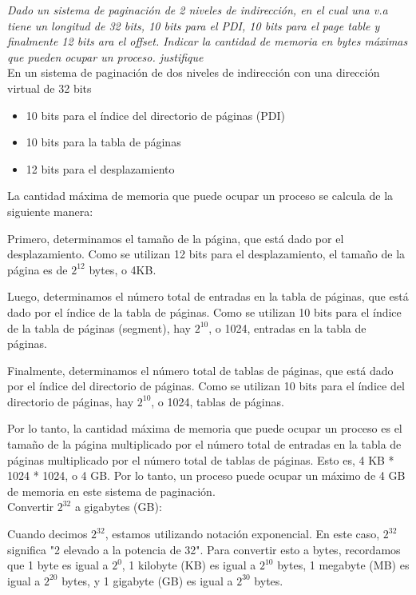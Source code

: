 \documentclass[../main.tex]{subfiles}
\begin{document}
    \begin{exercise}
        \textit{Dado un sistema de paginación de 2 niveles de indirección, en el cual una v.a tiene un longitud de 32 bits, 10 bits para el PDI, 10 bits para el page table y finalmente 12 bits ara el offset. Indicar la cantidad de memoria en bytes máximas que pueden ocupar un proceso. justifique}\\
        
        En un sistema de paginación de dos niveles de indirección con una dirección virtual de 32 bits

        \begin{itemize}
            \item 10 bits para el índice del directorio de páginas (PDI)
            \item 10 bits para la tabla de páginas
            \item 12 bits para el desplazamiento
        \end{itemize}

        La cantidad máxima de memoria que puede ocupar un proceso se calcula de la siguiente manera:

        Primero, determinamos el tamaño de la página, que está dado por el desplazamiento. Como se utilizan 12 bits para el desplazamiento, el tamaño de la página es de $2^12$ bytes, o 4KB.

        Luego, determinamos el número total de entradas en la tabla de páginas, que está dado por el índice de la tabla de páginas. Como se utilizan 10 bits para el índice de la tabla de páginas (segment), hay $2^10$, o 1024, entradas en la tabla de páginas.

        Finalmente, determinamos el número total de tablas de páginas, que está dado por el índice del directorio de páginas. Como se utilizan 10 bits para el índice del directorio de páginas, hay $2^10$, o 1024, tablas de páginas.

        Por lo tanto, la cantidad máxima de memoria que puede ocupar un proceso es el tamaño de la página multiplicado por el número total de entradas en la tabla de páginas multiplicado por el número total de tablas de páginas. Esto es, 4 KB * 1024 * 1024, o 4 GB. Por lo tanto, un proceso puede ocupar un máximo de 4 GB de memoria en este sistema de paginación.\\

        Convertir \(2^{32}\) a gigabytes (GB):

        Cuando decimos \(2^{32}\), estamos utilizando notación exponencial. En este caso, \(2^{32}\) significa "2 elevado a la potencia de 32". Para convertir esto a bytes, recordamos que 1 byte es igual a \(2^0\), 1 kilobyte (KB) es igual a \(2^{10}\) bytes, 1 megabyte (MB) es igual a \(2^{20}\) bytes, y 1 gigabyte (GB) es igual a \(2^{30}\) bytes.


\end{exercise}
\end{document}
